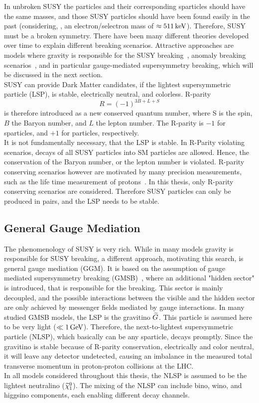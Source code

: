 In unbroken SUSY the particles and their corresponding sparticles should have the same masses, and those SUSY particles should have been found easily in the past (considering, \eg, an electron/selectron mass of $\approx511\,\text{ke\hspace{-.08em}V}$). Therefore, SUSY must be a broken symmetry. There have been many different theories developed over time to explain different breaking scenarios. Attractive approaches are models where gravity is responsible for the SUSY breaking~\cite{SUSYPrimer}, anomaly breaking scenarios~\cite{AMSB}, and in particular gauge-mediated supersymmetry breaking, which will be discussed in the next section.\\
SUSY can provide Dark Matter candidates, if the lightest supersymmetric particle (LSP), is stable, electrically neutral, and colorless.
R-parity
\begin{equation}
 R = (-1)^{3B+L+S}
\end{equation}
is therefore introduced as a new conserved quantum number, where S is the spin, $B$ the Baryon number, and $L$ the lepton number. The R-parity is $-1$ for sparticles, and $+1$ for particles, respectively.\\
It is not fundamentally necessary, that the LSP is stable. In R-Parity violating scenarios, decays of all SUSY particles into SM particles are allowed. Hence, the conservation of the Baryon number, or the lepton number is violated. R-parity conserving scenarios however are motivated by many precision measurements, such as the life time measurement of protons~\cite{ProtonDecay}.
In this thesis, only R-parity conserving scenarios are considered. Therefore SUSY particles can only be produced in pairs, and the LSP needs to be stable.\\



\subsection{General Gauge Mediation}\label{sec:GGM}
The phenomenology of SUSY is very rich. While in many models gravity is responsible for SUSY breaking, a different approach, motivating this search, is general gauge mediation (GGM). It is based on the assumption of gauge mediated supersymmetry breaking (GMSB)~\cite{GGM}, where an additional "hidden sector" is introduced, that is responsible for the breaking. This sector is mainly decoupled, and the possible interactions between the visible and the hidden sector are only achieved by messenger fields mediated by gauge interactions. In many studied GMSB models, the LSP is the gravitino $\widetilde{G}$. This particle is assumed here to be very light ($\ll1\,\text{Ge\hspace{-.08em}V}$). Therefore, the next-to-lightest supersymmetric particle (NLSP), which basically can be any sparticle, decays promptly. Since the gravitino is stable because of R-parity conservation, electrically and color neutral, it will leave any detector undetected, causing an imbalance in the measured total transverse momentum in proton-proton collisions at the LHC.\\
In all models considered throughout this thesis, the NLSP is assumed to be the lightest neutralino ($\widetilde{\chi}^{0}_{1}$). The mixing of the NLSP can include bino, wino, and higgsino components, each enabling different decay channels.


